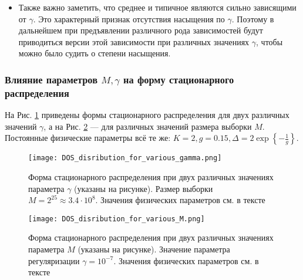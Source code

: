 \begin{itemize}
	\item Также важно заметить, что среднее и типичное являются сильно зависящими от $\gamma$. Это характерный признак отсутствия насыщения по $\gamma$. Поэтому в дальнейшем при предъявлении различного рода зависимостей будут приводиться версии этой зависимости при различных значениях $\gamma$, чтобы можно было судить о степени насыщения.
\end{itemize}

\subsubsection{Влияние параметров $M ,\gamma$  на форму стационарного распределения}
На Рис. \ref{fig:DOS_disribution_for_various_gamma} приведены формы стационарного распределения для двух различных значений $\gamma$, а на Рис. \ref{fig:DOS_disribution_for_various_M} --- для различных значений размера выборки $M$. Постоянные физические параметры всё те же: $K = 2, g = 0.15, \Delta = 2 \exp \left\{ -\frac{1}{g} \right\}$.
 
\begin{figure}[h!]
	\label{fig:DOS_disribution_for_various_gamma}
	\centering
	\texttt{[image: DOS\_disribution\_for\_various\_gamma.png]}
	\caption{Форма стационарного распределения при двух различных значениях параметра $\gamma$ (указаны на рисунке). Размер выборки $M = 2^{25} \approx 3.4 \cdot 10^8$. Значения физических параметров см. в тексте}
\end{figure}

\begin{figure}[h!]
	\label{fig:DOS_disribution_for_various_M}
	\centering
	\texttt{[image: DOS\_disribution\_for\_various\_M.png]}
	\caption{Форма стационарного распределения при двух различных значениях параметра $M$ (указаны на рисунке). Значение параметра регуляризации $\gamma = 10^{-7}$. Значения физических параметров см. в тексте}
\end{figure}

